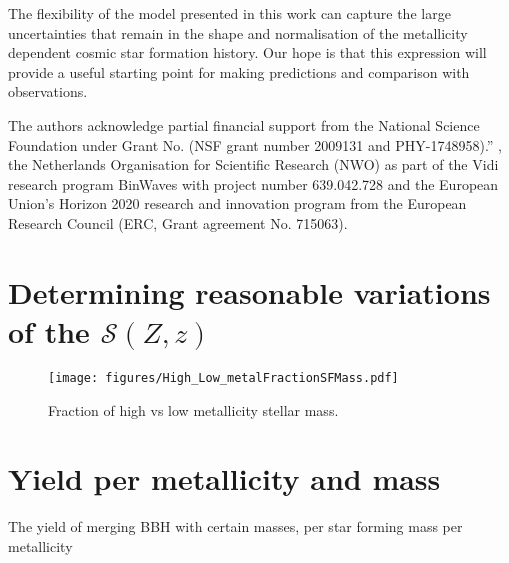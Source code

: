 \documentclass[twocolumn]{aastex631}
\newcommand{\SFRDzZ}{\ensuremath{\mathcal{S}(Z,z)}\xspace}
\begin{document}
The flexibility of the model presented in this work can capture the large uncertainties that remain in the shape and normalisation of the metallicity dependent cosmic star formation history. 
Our hope is that this expression will provide a useful starting point for making predictions and comparison with observations.




\begin{acknowledgments}
The authors acknowledge partial financial support from the  National Science Foundation under Grant No. (NSF grant number 2009131  and PHY-1748958).”
, the Netherlands Organisation for Scientific Research (NWO) as part of the Vidi research program BinWaves with project number 639.042.728 and the European Union’s Horizon 2020 research and innovation program from the European Research Council (ERC, Grant agreement No. 715063). 
\end{acknowledgments}


\appendix

\section{Determining reasonable variations of the \SFRDzZ}


\begin{figure}
\centering
{}
\texttt{[image: figures/High\_Low\_metalFractionSFMass.pdf]}
\caption{Fraction of high vs low metallicity stellar mass.
   \label{fig: low high Z fraction}
  }
\end{figure}


\section{Yield per metallicity and mass \label{app: mass metal yield}}
The yield of merging BBH with certain masses, per star forming mass per metallicity




\end{document}
